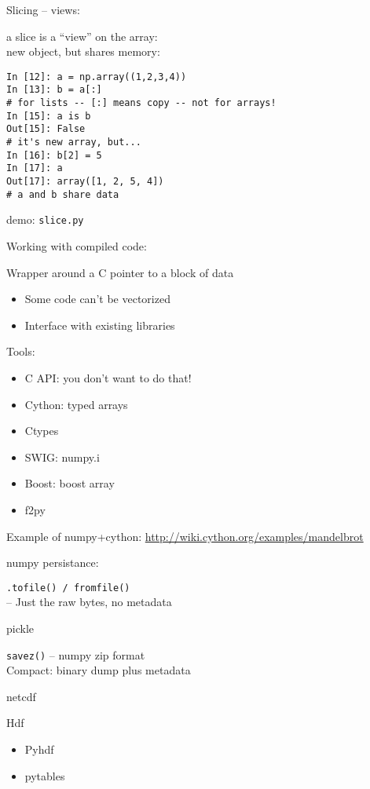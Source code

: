 \documentclass{beamer}
\begin{document}
\begin{frame}[fragile]{Slicing -- views:}

{\Large a slice is a ``view'' on the array:\\
new object, but shares memory:}

\begin{verbatim}
In [12]: a = np.array((1,2,3,4))
In [13]: b = a[:]
# for lists -- [:] means copy -- not for arrays!
In [15]: a is b
Out[15]: False
# it's new array, but...
In [16]: b[2] = 5
In [17]: a
Out[17]: array([1, 2, 5, 4])
# a and b share data
\end{verbatim}

\vfill
{\large demo: \verb|slice.py|}
\end{frame} 


\begin{frame}[fragile]{Working with compiled code:}

{\Large Wrapper around a C pointer to a block of data}

\begin{itemize}
  \item Some code can't be vectorized
  \item Interface with existing libraries
\end{itemize}

\vfill
{\Large Tools:}
\begin{itemize}
  \item C API: you don't want to do that!
  \item Cython: typed arrays
  \item Ctypes 
  \item SWIG: numpy.i 
  \item Boost: boost array
  \item f2py
\end{itemize}

\vfill
Example of numpy+cython: \url{http://wiki.cython.org/examples/mandelbrot}
\end{frame} 

\begin{frame}[fragile]{numpy persistance:}

{\Large \verb|.tofile() / fromfile()|}\\
 -- Just the raw bytes, no metadata

\vfill
{\Large pickle }

\vfill
{\Large \verb|savez()| -- numpy zip format}\\
Compact: binary dump plus metadata

\vfill
{\Large netcdf}

\vfill
{\Large Hdf}
\begin{itemize}
  \item Pyhdf
  \item pytables
\end{itemize}


\end{frame} 
\end{document}
